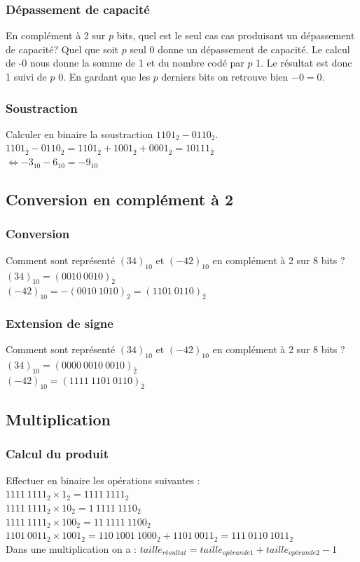 \documentclass[10pt,a4paper]{article}
\begin{document}
\subsubsection{Dépassement de capacité}
En complément à 2 sur $p$ bits, quel est le seul cas cas produisant un dépassement de capacité?
Quel que soit $p$ seul 0 donne un dépassement de capacité. Le calcul de -0 nous donne la somme de 1 et du nombre codé par $p$ 1. Le résultat est donc 1 suivi de $p$ 0. En gardant que les $p$ derniers bits on retrouve bien $-0 = 0$.

\subsubsection{Soustraction}
Calculer en binaire la soustraction $1101_{2}-0110_{2}$.\\
$1101_{\bar{2}}-0110_{\bar{2}} = 1101_{\bar{2}}+1001_{\bar{2}}+0001_{\bar{2}} = 10111_{\bar{2}}$\\
$\Leftrightarrow -3_{10}-6_{10} = -9_{10}$ 

\subsection{Conversion en complément à 2}
\subsubsection{Conversion}
Comment sont représenté $(34)_{10}$ et $(-42)_{10}$ en complément à 2 sur 8 bits ?\\
$(34)_{10} = (0010\:0010)_{\bar{2}}$\\
$(-42)_{10} = -(0010\:1010)_{\bar{2}} = (1101\:0110)_{\bar{2}}$

\subsubsection{Extension de signe}
Comment sont représenté $(34)_{10}$ et $(-42)_{10}$ en complément à 2 sur 8 bits ?\\
$(34)_{10} = (0000\:0010\:0010)_{\bar{2}}$\\
$(-42)_{10} = (1111\:1101\:0110)_{\bar{2}}$

\subsection{Multiplication}
\subsubsection{Calcul du produit}
Effectuer en binaire les opérations suivantes :\\
$1111\:1111_{2} \times 1_{2} = 1111\:1111_{2}$\\
$1111\:1111_{2} \times 10_{2} = 1\:1111\:1110_{2}$\\
$1111\:1111_{2} \times 100_{2} = 11\:1111\:1100_{2}$\\
$1101\:0011_{2} \times 1001_{2} =  110\:1001\:1000_{2} + 1101\:0011_{2} = 111\:0110\:1011_{2}$\\
Dans une multiplication on a : $taille_{résultat} = taille_{opérande1}+taille_{opérande2}-1$
\end{document}
